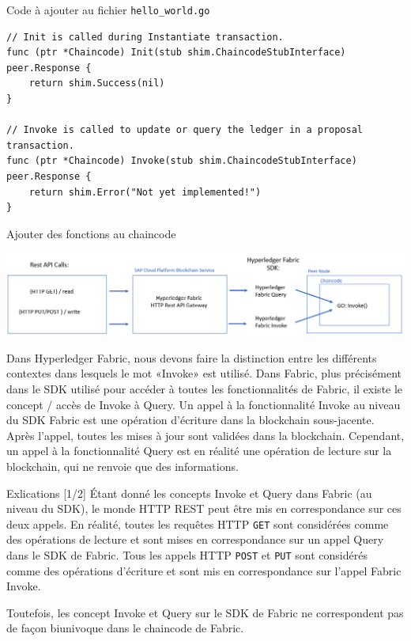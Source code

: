 \documentclass[presentation]{beamer}
\begin{document}
\begin{frame}[fragile,label={sec:org69bdb5c}]{Code à ajouter au fichier \texttt{hello\_world.go}}
 \begin{verbatim}
// Init is called during Instantiate transaction.
func (ptr *Chaincode) Init(stub shim.ChaincodeStubInterface) peer.Response {
	return shim.Success(nil)
}

// Invoke is called to update or query the ledger in a proposal transaction.
func (ptr *Chaincode) Invoke(stub shim.ChaincodeStubInterface) peer.Response {
	return shim.Error("Not yet implemented!")
}
\end{verbatim}
\end{frame}
\begin{frame}[label={sec:orgf4fa4c5}]{Ajouter des fonctions au chaincode}
\begin{center}
\includegraphics[width=.9\linewidth]{./rest_api_calls.png}
\end{center}

Dans Hyperledger Fabric, nous devons faire la distinction entre les différents contextes dans lesquels
le mot «Invoke» est utilisé. 
Dans Fabric, plus précisément dans le SDK utilisé pour accéder à toutes les fonctionnalités de Fabric, 
il existe le concept / accès de Invoke à Query. 
Un appel à la fonctionnalité Invoke au niveau du SDK Fabric est une opération 
d'écriture dans la blockchain sous-jacente. 
Après l'appel, toutes les mises à jour sont validées dans la blockchain. 
Cependant, un appel à la fonctionnalité Query est en réalité une opération de lecture sur la blockchain, 
qui ne renvoie que des informations.
\end{frame}

\begin{frame}[fragile,label={sec:org9c10388}]{Exlications [1/2]}
 Étant donné les concepts Invoke et Query dans Fabric (au niveau du SDK), 
le monde HTTP REST peut être mis en correspondance sur ces deux appels. 
En réalité, toutes les requêtes HTTP \texttt{GET} sont considérées comme des 
opérations de lecture et sont mises en correspondance sur un appel Query dans le SDK de Fabric. 
Tous les appels HTTP \texttt{POST} et \texttt{PUT} sont considérés comme des opérations d'écriture et sont
mis en correspondance sur l'appel Fabric Invoke.

Toutefois, les concept Invoke et Query sur le SDK de Fabric ne correspondent pas de façon biunivoque
dans le chaincode de Fabric. 
\end{frame}
\end{document}
